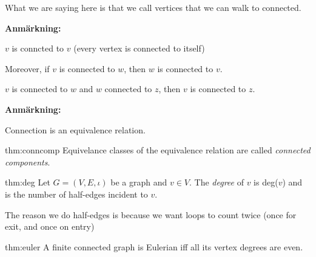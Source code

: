\par\bigskip
\noindent What we are saying here is that we call vertices that we can walk to connected.
\par\bigskip
\noindent\textbf{Anmärkning:}\par
\noindent $v$ is conncted to $v$ (every vertex is connected to itself)\par
\noindent Moreover, if $v$ is connected to $w$, then $w$ is connected to $v$.\par
\noindent $v$ is connected to $w$ and $w$ connected to $z$, then $v$ is connected to $z$.
\par\bigskip
\noindent\textbf{Anmärkning:}\par
\noindent Connection is an equivalence relation.
\par\bigskip
\begin{theo}{thm:conncomp}
  Equivelance classes of the equivalence relation are called \textit{connected components}.
\end{theo}
\par\bigskip
\begin{theo}{thm:deg}
  Let $G=(V,E,\iota)$ be a graph and $v\in V$. The \textit{degree} of $v$ is deg($v$) and is the number of half-edges incident to $v$.
\end{theo}\par
\noindent The reason we do half-edges is because we want loops to count twice (once for exit, and once on entry)
\par\bigskip
\begin{theo}[Euler; 1736]{thm:euler}
  A finite connected graph is Eulerian iff all its vertex degrees are even. 
\end{theo}
\newpage
